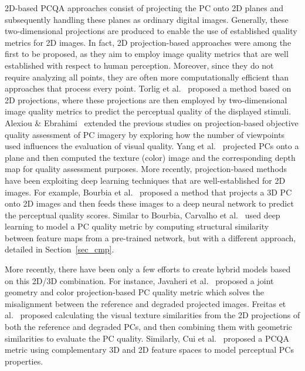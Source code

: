 \documentclass[final,3p,times,twocolumn]{elsarticle}
\begin{document}
2D-based \gls{PCQA} approaches consist of projecting the \gls{PC} onto 2D planes and subsequently handling these planes as ordinary digital images. Generally, these two-dimensional projections are produced to enable the use of established quality metrics for 2D images. In fact, 2D projection-based approaches were among the first to be proposed, as they aim to employ image quality metrics that are well established with respect to human perception. Moreover, since they do not require analyzing all points, they are often more computationally efficient than approaches that process every point. Torlig et al.~\cite{Torlig2018anovel} proposed a method based on 2D projections, where these projections are then employed by two-dimensional image quality metrics to predict the perceptual quality of the displayed stimuli. Alexiou \& Ebrahimi~\cite{alexiou2019exploiting} extended the previous studies on projection-based objective quality assessment of \gls{PC} imagery by exploring how the number of viewpoints used influences the evaluation of visual quality. Yang et al.~\cite{yang2020predicting} projected \glspl{PC} onto a plane and then computed the texture (color) image and the corresponding depth map for quality assessment purposes. More recently, projection-based methods have been exploiting deep learning techniques that are well-established for 2D images. For example, Bourbia et al.~\cite{bourbia2022blind, Bourbia20232, Bourbia2023multi} proposed a method that projects a \gls{3D} \gls{PC} onto 2D images and then feeds these images to a deep neural network to predict the perceptual quality scores. Similar to Bourbia, Carvalho et al.~\cite{Carvalho2024perception} used deep learning to model a \gls{PC} quality metric by computing structural similarity between feature maps from a pre-trained network, but with a different approach, detailed in Section~\ref{sec_cmp}.


More recently, there have been only a few efforts to create hybrid models based on this 2D/3D combination. For instance, Javaheri et al.~\cite{Javaheri2022joint} proposed a joint geometry and color projection-based \gls{PC} quality metric which solves the misalignment between the reference and degraded projected images. Freitas et al.~\cite{freitas2023point} proposed calculating the visual texture similarities from the 2D projections of both the reference and degraded \glspl{PC}, and then combining them with geometric similarities to evaluate the \gls{PC} quality. Similarly, Cui et al.~\cite{Cui2024Colored} proposed a \gls{PCQA} metric using complementary \gls{3D} and 2D feature spaces to model perceptual \glspl{PC} properties. 
\end{document}
